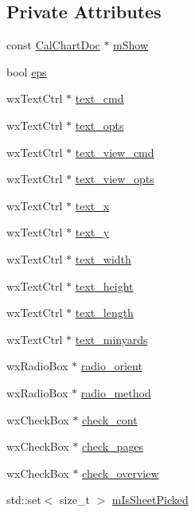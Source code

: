\subsection*{Private Attributes}
\begin{DoxyCompactItemize}
\item 
const \hyperlink{a00020}{Cal\-Chart\-Doc} $\ast$ \hyperlink{a00117_a20dfb431827c263ea9c3f2940512ed6b}{m\-Show}
\item 
bool \hyperlink{a00117_a69756bd8deefa9295f21bc633537cf29}{eps}
\item 
wx\-Text\-Ctrl $\ast$ \hyperlink{a00117_a7672c4920bde21f0f70acc30dbb92184}{text\-\_\-cmd}
\item 
wx\-Text\-Ctrl $\ast$ \hyperlink{a00117_ace987329924ed3a2607631a3d6808c66}{text\-\_\-opts}
\item 
wx\-Text\-Ctrl $\ast$ \hyperlink{a00117_a9741b9553b93285ca44b66bbfc0ae589}{text\-\_\-view\-\_\-cmd}
\item 
wx\-Text\-Ctrl $\ast$ \hyperlink{a00117_a2f1d370897dce9ec8c12788315ebf6e4}{text\-\_\-view\-\_\-opts}
\item 
wx\-Text\-Ctrl $\ast$ \hyperlink{a00117_a6c7b6ae5afe5a6112d6febf81e010349}{text\-\_\-x}
\item 
wx\-Text\-Ctrl $\ast$ \hyperlink{a00117_ac06da96a4a86a1ae63c767ab5545e96b}{text\-\_\-y}
\item 
wx\-Text\-Ctrl $\ast$ \hyperlink{a00117_ac7a10b02601db8d15417d51f6da4f1c1}{text\-\_\-width}
\item 
wx\-Text\-Ctrl $\ast$ \hyperlink{a00117_a49c56465c83c2fcbb3d549ed4ac64e2e}{text\-\_\-height}
\item 
wx\-Text\-Ctrl $\ast$ \hyperlink{a00117_a0b3bd76c1df408e07039d44bcb789ae4}{text\-\_\-length}
\item 
wx\-Text\-Ctrl $\ast$ \hyperlink{a00117_a45c73e4ce9746a0442bc09c57c165a77}{text\-\_\-minyards}
\item 
wx\-Radio\-Box $\ast$ \hyperlink{a00117_aa8425483e849f70d02818e91f273d1b5}{radio\-\_\-orient}
\item 
wx\-Radio\-Box $\ast$ \hyperlink{a00117_a67097e16737c86711a4f26ce6b1f2712}{radio\-\_\-method}
\item 
wx\-Check\-Box $\ast$ \hyperlink{a00117_ac34e9bdaba89bcdcd57ccf7bea32d924}{check\-\_\-cont}
\item 
wx\-Check\-Box $\ast$ \hyperlink{a00117_a42be6fea1296b3a514e2d68cdf1f03d0}{check\-\_\-pages}
\item 
wx\-Check\-Box $\ast$ \hyperlink{a00117_a335ae1afa16d77185f5acd470b009fca}{check\-\_\-overview}
\item 
std\-::set$<$ size\-\_\-t $>$ \hyperlink{a00117_a746d4d8315097cbc7d4643b34fbe6936}{m\-Is\-Sheet\-Picked}
\end{DoxyCompactItemize}


